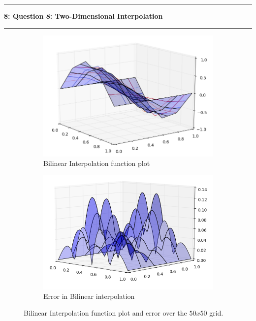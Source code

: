 \documentclass[11pt]{article}
\newcommand\question[2]{\vspace{.25in}\hrule\textbf{#1: #2}\vspace{.5em}\hrule\vspace{.10in}}
\begin{document}
\pagebreak

\question{8}{Question 8: Two-Dimensional Interpolation } 
\setcounter{section}{8}
\setcounter{subsection}{0}

\begin{figure}
        \centering
        \begin{subfigure}{.5\textwidth}
  \centering
        \includegraphics[width=1\linewidth]{q8/lin_func_5.png}
                \caption{Bilinear Interpolation function plot}
                \label{fig:q8_lin_func}
                \end{subfigure}%
\begin{subfigure}{.5\textwidth}
  \centering
        \includegraphics[width=1\linewidth]{q8/lin_err_5.png}
                \caption{Error in Bilinear interpolation}
                \label{fig:q8_lin_err}
	\end{subfigure}
            
\caption{Bilinear Interpolation function plot and error over the $50x50$ grid.}
\label{fig:q8_lin}        
\end{figure}  
\end{document}
